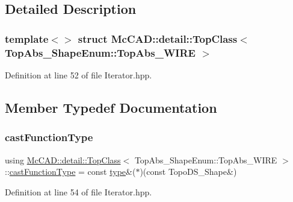 \subsection{Detailed Description}
\subsubsection*{template$<$$>$\newline
struct Mc\+C\+A\+D\+::detail\+::\+Top\+Class$<$ Top\+Abs\+\_\+\+Shape\+Enum\+::\+Top\+Abs\+\_\+\+W\+I\+R\+E $>$}



Definition at line 52 of file Iterator.\+hpp.



\subsection{Member Typedef Documentation}
\mbox{\label{structMcCAD_1_1detail_1_1TopClass_3_01TopAbs__ShapeEnum_1_1TopAbs__WIRE_01_4_a120749c40c7f17c80a8067ec30bcd47a}} 
\subsubsection{\texorpdfstring{cast\+Function\+Type}{castFunctionType}}
{\footnotesize\ttfamily using \hyperlink{structMcCAD_1_1detail_1_1TopClass}{Mc\+C\+A\+D\+::detail\+::\+Top\+Class}$<$ Top\+Abs\+\_\+\+Shape\+Enum\+::\+Top\+Abs\+\_\+\+W\+I\+RE $>$\+::\hyperlink{structMcCAD_1_1detail_1_1TopClass_3_01TopAbs__ShapeEnum_1_1TopAbs__WIRE_01_4_a120749c40c7f17c80a8067ec30bcd47a}{cast\+Function\+Type} =  const \hyperlink{structMcCAD_1_1detail_1_1TopClass_3_01TopAbs__ShapeEnum_1_1TopAbs__WIRE_01_4_a56e2df25e7b21da6053dffac1ff0401c}{type}\&($\ast$)(const Topo\+D\+S\+\_\+\+Shape\&)}



Definition at line 54 of file Iterator.\+hpp.

